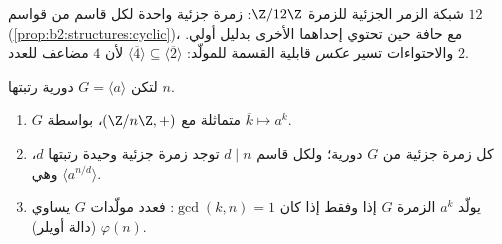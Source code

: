 \begin{omfigure}

{\small شبكة الزمر الجزئية للزمرة $\Z/12\Z$: زمرة جزئية واحدة لكل
قاسم من قواسم $12$ (\cref{prop:b2:structures:cyclic})، مع حافة
حين تحتوي إحداهما الأخرى بدليل أولي. والاحتواءات تسير
\emph{عكس} قابلية القسمة للمولّد: $\langle\overline
4\rangle \subseteq \langle\overline2\rangle$ لأن $4$
مضاعف للعدد $2$.}
\end{omfigure}

\begin{proposition}\label{prop:b2:structures:cyclic}
لتكن $G = \langle a \rangle$ دورية رتبتها $n$.
\begin{enumerate}
  \item $G$ متماثلة مع $(\Z/n\Z, +)$، بواسطة $\overline k \mapsto
        a^k$.
  \item كل زمرة جزئية من $G$ دورية؛ ولكل قاسم $d \mid n$
        توجد زمرة جزئية وحيدة رتبتها $d$، وهي $\langle
        a^{n/d}\rangle$.
  \item يولّد $a^k$ الزمرة $G$ إذا وفقط إذا كان $\gcd(k, n) = 1$: فعدد مولّدات
        $G$ يساوي $\varphi(n)$ (دالة أويلر).
\end{enumerate}
\end{proposition}

